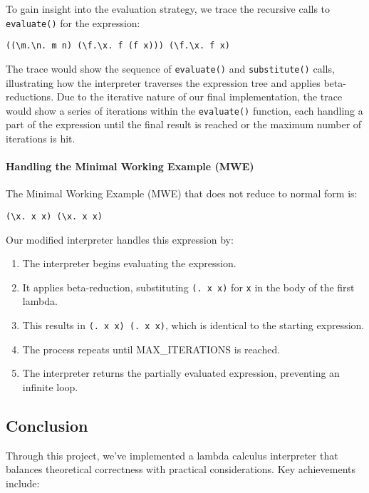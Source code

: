 \documentclass{article}
\theoremstyle{theorem}
\theoremstyle{definition}
\theoremstyle{remark}
\begin{document}
To gain insight into the evaluation strategy, we trace the recursive calls to \texttt{evaluate()} for the expression:

\begin{verbatim}
((\m.\n. m n) (\f.\x. f (f x))) (\f.\x. f x)
\end{verbatim}

The trace would show the sequence of \texttt{evaluate()} and \texttt{substitute()} calls, illustrating how the interpreter traverses the expression tree and applies beta-reductions. Due to the iterative nature of our final implementation, the trace would show a series of iterations within the \texttt{evaluate()} function, each handling a part of the expression until the final result is reached or the maximum number of iterations is hit.

\paragraph{Handling the Minimal Working Example (MWE)}

The Minimal Working Example (MWE) that does not reduce to normal form is:

\begin{verbatim}
(\x. x x) (\x. x x)
\end{verbatim}

Our modified interpreter handles this expression by:

\begin{enumerate}
    \item The interpreter begins evaluating the expression.
    \item It applies beta-reduction, substituting \texttt{(\x. x x)} for \texttt{x} in the body of the first lambda.
    \item This results in \texttt{(\x. x x) (\x. x x)}, which is identical to the starting expression.
    \item The process repeats until MAX\_ITERATIONS is reached.
    \item The interpreter returns the partially evaluated expression, preventing an infinite loop.
\end{enumerate}

\subsection{Conclusion}

Through this project, we've implemented a lambda calculus interpreter that balances theoretical correctness with practical considerations. Key achievements include:
\end{document}

